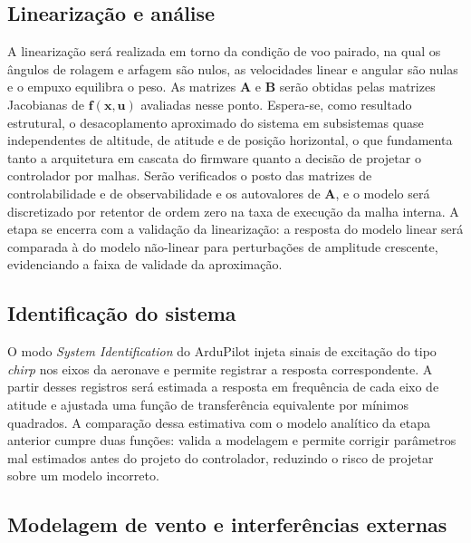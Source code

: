 \documentclass[12pt,a4paper]{article}
\begin{document}
\subsection{Linearização e análise}

A linearização será realizada em torno da condição de voo pairado, na qual os
ângulos de rolagem e arfagem são nulos, as velocidades linear e angular são nulas e
o empuxo equilibra o peso. As matrizes $\mathbf{A}$ e $\mathbf{B}$ serão obtidas
pelas matrizes Jacobianas de $\mathbf{f}(\mathbf{x},\mathbf{u})$ avaliadas nesse
ponto. Espera-se, como resultado estrutural, o desacoplamento aproximado do sistema
em subsistemas quase independentes de altitude, de atitude e de posição horizontal,
o que fundamenta tanto a arquitetura em cascata do firmware quanto a decisão de
projetar o controlador por malhas. Serão verificados o posto das matrizes de
controlabilidade e de observabilidade e os autovalores de $\mathbf{A}$, e o modelo
será discretizado por retentor de ordem zero na taxa de execução da malha interna. A
etapa se encerra com a validação da linearização: a resposta do modelo linear será
comparada à do modelo não-linear para perturbações de amplitude crescente,
evidenciando a faixa de validade da aproximação.

\subsection{Identificação do sistema}

O modo \emph{System Identification} do ArduPilot injeta sinais de excitação do tipo
\emph{chirp} nos eixos da aeronave e permite registrar a resposta correspondente. A
partir desses registros será estimada a resposta em frequência de cada eixo de
atitude e ajustada uma função de transferência equivalente por mínimos quadrados. A
comparação dessa estimativa com o modelo analítico da etapa anterior cumpre duas
funções: valida a modelagem e permite corrigir parâmetros mal estimados antes do
projeto do controlador, reduzindo o risco de projetar sobre um modelo incorreto.

\subsection{Modelagem de vento e interferências externas}
\end{document}
